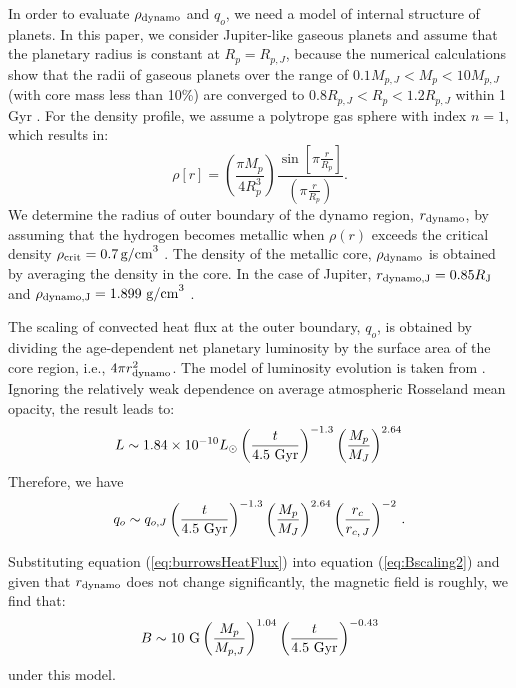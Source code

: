 \documentclass{emulateapj}
\begin{document}
In order to evaluate $\rho _{\rm dynamo}$ and $q_o$, we need a model of internal structure of planets. 
In this paper, we consider Jupiter-like gaseous planets and assume that the planetary radius is constant at $R_p = R_{p,J}$, because the numerical calculations show that the radii of gaseous planets over the range of $0.1 M_{p, J} < M_p < 10M_{p, J}$ (with core mass less than 10\%) are converged to $0.8 R_{p, J} < R_p < 1.2R_{p, J}$ within 1 Gyr \citep{fortney2007}. 
For the density profile, we assume a polytrope gas sphere with index $n=1$, which results in:
\begin{equation}
\rho [r] = \left( \frac{\pi M_p}{4 R_p^3} \right) \frac{\sin \left[ \pi \frac{r}{R_p} \right]}{\left( \pi \frac{r}{R_p} \right)}. \label{eq:rho_r}
\end{equation}
We determine the radius of outer boundary of the dynamo region, $r_{\rm dynamo}$, by assuming that the hydrogen becomes metallic when $\rho (r)$ exceeds the critical density $\rho_{\rm crit}=0.7\,\mbox{g/cm}^3$ \citep{exoplanets2006, griesmeier2007b}. The density of the metallic core, $\rho _{\rm dynamo}$ is obtained by averaging the density in the core. 
In the case of Jupiter, $r_{\rm dynamo, J} = 0.85 R_{\rm J}$ and $\rho_{\rm dynamo, J} = 1.899~{\rm g/cm}^3$  .  

The scaling of convected heat flux at the outer boundary, $q_o$, is obtained by dividing the age-dependent net planetary luminosity by the surface area of the core region, i.e., $4\pi r_{\rm dynamo}^2$. 
The model of luminosity evolution is taken from \citet{burrows_et_al2001} \citep[see also][]{marley2007}. 
Ignoring the relatively weak dependence on  average atmospheric Rosseland mean opacity, the result leads to:
\begin{equation}
L \sim 1.84\times10^{-10} L_\odot \left( \frac{t}{4.5 \rm~Gyr} \right)^{-1.3} \left( \frac{M_p}{M_J} \right)^{2.64} \, 	
\label{eq:burrowsLum}
\end{equation}
Therefore, we have
\begin{equation}
q_o \sim q_{o, J} \left( \frac{t}{4.5 \rm~Gyr} \right)^{-1.3} \left( \frac{M_p}{M_J} \right)^{2.64} \left( \frac{r_c}{r_{c,\,J}} \right)^{-2}\, .
\label{eq:burrowsHeatFlux}
\end{equation}

Substituting equation (\ref{eq:burrowsHeatFlux}) into equation (\ref{eq:Bscaling2}) and given that $r_{\rm dynamo} $ does not change significantly, the magnetic field is roughly, we find that:
\begin{equation}
B   \sim   10~{\rm G} \left( \frac{M_p }{M_{p,J}} \right)^{1.04} \left( \frac{t}{4.5~\rm{Gyr}} \right)^{-0.43} \label{eq:scalingB}
\end{equation}
under this model. 
\end{document}
